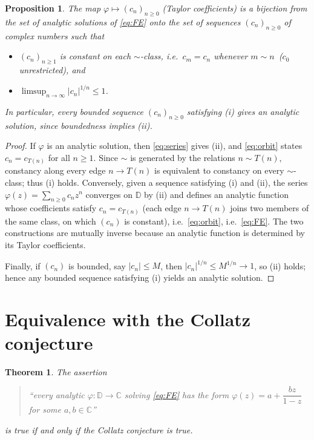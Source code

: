 \documentclass{amsart}
\newtheorem{theorem}{Theorem}
\newtheorem{proposition}{Proposition}
\theoremstyle{remark}
\begin{document}
\begin{proposition}\label{prop:correspondence}
The map $\varphi\mapsto (c_n)_{n\ge0}$ (Taylor coefficients) is a bijection from the set of
analytic solutions of \eqref{eq:FE} onto the set of sequences $(c_n)_{n\ge0}$ of complex numbers
such that
\begin{itemize}
\item[(i)] $(c_n)_{n\ge1}$ is constant on each $\sim$-class, i.e.\ $c_m=c_n$ whenever
$m\sim n$ \,($c_0$ unrestricted), and
\item[(ii)] $\limsup_{n\to\infty}|c_n|^{1/n}\le1$.
\end{itemize}
In particular, \emph{every bounded} sequence $(c_n)_{n\ge0}$ satisfying (i) gives an analytic
solution, since boundedness implies (ii).
\end{proposition}
\begin{proof}
If $\varphi$ is an analytic solution, then \eqref{eq:series} gives (ii), and \eqref{eq:orbit}
states $c_n=c_{T(n)}$ for all $n\ge1$. Since $\sim$ is generated by the relations $n\sim T(n)$,
constancy along every edge $n\to T(n)$ is equivalent to constancy on every $\sim$-class; thus (i)
holds. Conversely, given a sequence satisfying (i) and (ii), the series
$\varphi(z)=\sum_{n\ge0}c_n z^n$ converges on $\mathbb{D}$ by (ii) and defines an analytic
function whose coefficients satisfy $c_n=c_{T(n)}$ (each edge $n\to T(n)$ joins two members of the
same class, on which $(c_n)$ is constant), i.e.\ \eqref{eq:orbit}, i.e.\ \eqref{eq:FE}. The two
constructions are mutually inverse because an analytic function is determined by its Taylor
coefficients.

Finally, if $(c_n)$ is bounded, say $|c_n|\le M$, then $|c_n|^{1/n}\le M^{1/n}\to1$, so (ii)
holds; hence any bounded sequence satisfying (i) yields an analytic solution.
\end{proof}

\section{Equivalence with the Collatz conjecture}

\begin{theorem}\label{thm:main}
The assertion
\begin{quote}
``every analytic $\varphi:\mathbb{D}\to\mathbb{C}$ solving \eqref{eq:FE} has the form
$\varphi(z)=a+\dfrac{bz}{1-z}$ for some $a,b\in\mathbb{C}$''
\end{quote}
is true if and only if the Collatz conjecture is true.
\end{theorem}
\end{document}
